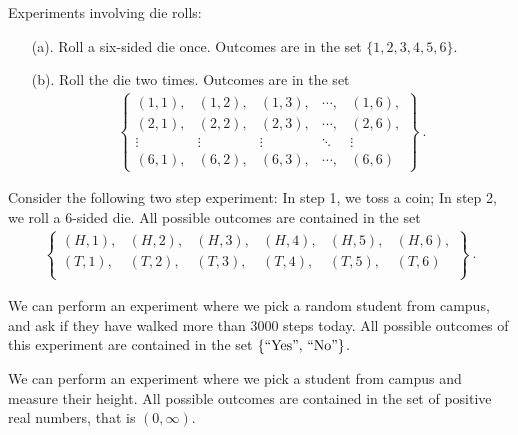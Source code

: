 \begin{ex}
        Experiments involving die rolls:
\begin{enumerate}
\item[(a).] Roll a six-sided die once. 
Outcomes are in the set $\{1,2,3,4,5,6\}$.
\item[(b).] Roll the die two times. Outcomes are in the set
\begin{align*}
\left\{
\begin{matrix}
(1,1), & (1,2), & (1,3), & \cdots , & (1,6),\\
(2,1), & (2,2), & (2,3), & \cdots , & (2,6),\\
\vdots & \vdots & \vdots & \ddots  & \vdots\\
(6,1), & (6,2), & (6,3), & \cdots , & (6,6)
\end{matrix}
\right\}\ .
\end{align*}
\end{enumerate}
\end{ex}





\begin{ex}
    Consider the following two step experiment: In step 1, we toss a coin; In step 2, we roll a 6-sided die. All possible outcomes are contained in the set
\begin{align*}
\left\{
\begin{matrix}
(H,1), &(H,2), &(H,3),& (H,4),& (H,5),& (H,6), \\
(T,1),& (T,2), &(T,3), &(T,4),& (T,5), &(T,6) \\
\end{matrix}
\right\}\ .
\end{align*}
\end{ex} 

\begin{ex}
    We can perform an experiment where we pick a random student from campus, and ask if they have walked more than 3000 steps today. All possible outcomes of this experiment are contained in the set $\{``\text{Yes}",\,``\text{No}"\}$.
\end{ex}

\begin{ex}
    We can perform an experiment where we pick a student from campus and measure their height. All possible outcomes are contained in the set of positive real numbers, that is $(0, \infty)$.
\end{ex}
 


